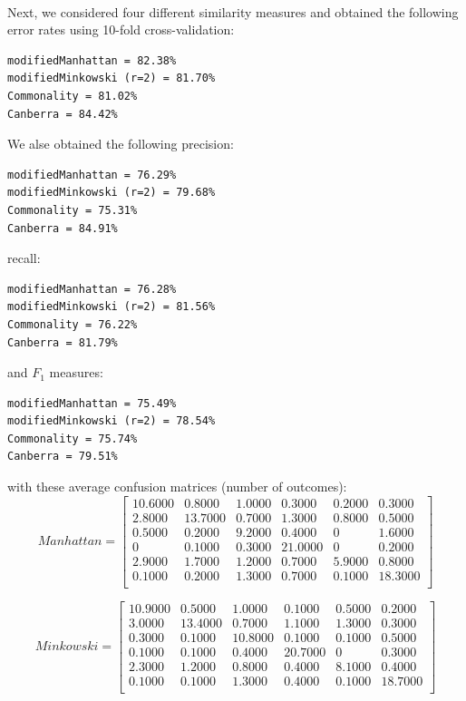 \documentclass[a4paper,12pt,oneside,final]{report}
\begin{document}
\paragraph{}
Next, we considered four different similarity measures and obtained the following error rates using 10-fold cross-validation:
\begin{verbatim}
modifiedManhattan = 82.38%
modifiedMinkowski (r=2) = 81.70%
Commonality = 81.02%
Canberra = 84.42%
\end{verbatim}
We alse obtained the following precision:
\begin{verbatim}
modifiedManhattan = 76.29%
modifiedMinkowski (r=2) = 79.68%
Commonality = 75.31%
Canberra = 84.91%
\end{verbatim}
recall:
\begin{verbatim}
modifiedManhattan = 76.28%
modifiedMinkowski (r=2) = 81.56%
Commonality = 76.22%
Canberra = 81.79%
\end{verbatim}
and $F_1$ measures:
\begin{verbatim}
modifiedManhattan = 75.49%
modifiedMinkowski (r=2) = 78.54%
Commonality = 75.74%
Canberra = 79.51%
\end{verbatim}
with these average confusion matrices (number of outcomes):
\[
Manhattan = \left[\begin{array}{cccccc}
   10.6000 &   0.8000 &   1.0000 &   0.3000 &   0.2000 &   0.3000\\
    2.8000 &  13.7000 &   0.7000 &   1.3000 &   0.8000 &   0.5000\\
    0.5000 &   0.2000 &   9.2000 &   0.4000 &        0 &   1.6000\\
         0 &   0.1000 &   0.3000 &  21.0000 &        0 &   0.2000\\
    2.9000 &   1.7000 &   1.2000 &   0.7000 &   5.9000 &   0.8000\\
    0.1000 &   0.2000 &   1.3000 &   0.7000 &   0.1000 &  18.3000\\
\end{array}
\right]
\]

\[
Minkowski = \left[\begin{array}{cccccc}
   10.9000 &   0.5000 &   1.0000 &   0.1000 &   0.5000 &   0.2000\\
    3.0000 &  13.4000 &   0.7000 &   1.1000 &   1.3000 &   0.3000\\
    0.3000 &   0.1000 &  10.8000 &   0.1000 &   0.1000 &   0.5000\\
    0.1000 &   0.1000 &   0.4000 &  20.7000 &        0 &   0.3000\\
    2.3000 &   1.2000 &   0.8000 &   0.4000 &   8.1000 &   0.4000\\
    0.1000 &   0.1000 &   1.3000 &   0.4000 &   0.1000 &  18.7000\\
\end{array}
\right]
\]
\end{document}
